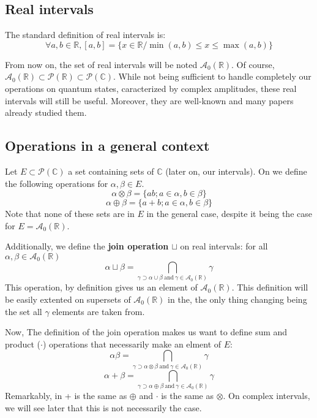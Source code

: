 \subsection{Real intervals}

The standard definition of real intervals is:
$$\forall a, b \in \mathbb{R}, [a, b]
= \{x \in \mathbb{R} / \min(a, b) \le x \le \max(a, b)\}$$

From now on, the set of real intervals will be noted $\mathcal{A}_0(\mathbb{R})$. Of course, $\mathcal{A}_0(\mathbb{R}) \subset \mathcal{P}(\mathbb{R}) \subset \mathcal{P}(\mathbb{C})$. While not being sufficient to handle completely our operations on quantum states, caracterized by complex amplitudes, these real intervals will still be useful. Moreover, they are well-known and many papers already studied them.

\subsection{Operations in a general context}
\label{general-operations}

Let $E \subset \mathcal{P}(\mathbb{C})$ a set containing sets of $\mathbb{C}$ (later on, our intervals). On we define the following operations for $\alpha, \beta \in E$.
$$\alpha \otimes \beta = \{a b ; a \in \alpha, b \in \beta\}$$
$$\alpha \oplus \beta = \{a + b ; a \in \alpha, b \in \beta\}$$
\noindent Note that none of these sets are in $E$ in the general case, despite it being the case for $E = \mathcal{A}_0(\mathbb{R})$.

Additionally, we define the \textbf{join operation $\sqcup$} on real intervals: for all $\alpha, \beta \in \mathcal{A}_0(\mathbb{R})$
$$\alpha \sqcup \beta = \bigcap_{\gamma \supset \alpha \cup \beta~\text{and}~\gamma \in \mathcal{A}_0(\mathbb{R})} \gamma$$
\noindent This operation, by definition gives us an element of $\mathcal{A}_0(\mathbb{R})$. This definition will be easily extented on supersets of $\mathcal{A}_0(\mathbb{R})$ in the, the only thing changing being the set all $\gamma$ elements are taken from.

Now,  The definition of the join operation makes us want to define sum and product ($\cdot$) operations that necessarily make an elment of $E$:
$$\alpha \beta = \bigcap_{\gamma \supset \alpha \otimes \beta~\text{and}~\gamma \in \mathcal{A}_0(\mathbb{R})} \gamma$$
$$\alpha + \beta = \bigcap_{\gamma \supset \alpha \oplus \beta~\text{and}~\gamma \in \mathcal{A}_0(\mathbb{R})} \gamma$$
\noindent Remarkably, in + is the same as $\oplus$ and $\cdot$ is the same as $\otimes$. On complex intervals, we will see later that this is not necessarily the case.

